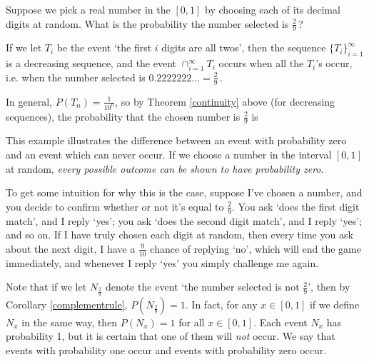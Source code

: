 \begin{examp}
Suppose we pick a real number in the $[0,1]$ by choosing each of its decimal digits at random. What is the probability the number selected is $\frac{2}{9}$\,?
\par
If we let $T_i$ be the event  `the first $i$ digits are all twos', then the sequence $\{T_i\}_{i=1}^{\infty}$ is a decreasing sequence, and the event $\cap_{i=1}^{\infty}T_i$ occurs when all the $T_i$'s occur, i.e. when the number selected is $0.2222222... = \frac{2}{9}$\,. 
\par
In general, $P(T_n) = \frac{1}{10^n}$, so by Theorem \ref{continuity} above (for decreasing sequences), the probability that the chosen number is $\frac{2}{9}$ is
\end{examp}
\par
This example illustrates the difference between an event with probability zero and an event which can never occur. If we choose a number in the interval $[0,1]$ at random, \emph{every possible outcome can be shown to have probability zero}.
\par
To get some intuition for why this is the case, suppose I've chosen a number, and you decide to confirm whether or not it's equal to $\frac{2}{9}$. You ask `does the first digit match', and I reply `yes'; you ask `does the second digit match', and I reply `yes'; and so on. If I have truly chosen each digit at random, then every time you ask about the next digit, I have a $\frac{9}{10}$ chance of replying `no', which will end the game immediately, and whenever I reply `yes' you simply challenge me again.
\par
Note that if we let $N_{\frac{2}{9}}$ denote the event `the number selected is not $\frac{2}{9}$', then by Corollary \ref{complementrule}, $P(N_{\frac{2}{9}}) = 1$. In fact, for any $x \in [0,1]$ if we define $N_x$ in the same way, then $P(N_x) = 1$ for all $x \in [0,1]$. Each event $N_x$ has probability 1, but it is certain that one of them will \emph{not} occur. We say that events with probability one  occur and events with probability zero  occur.
